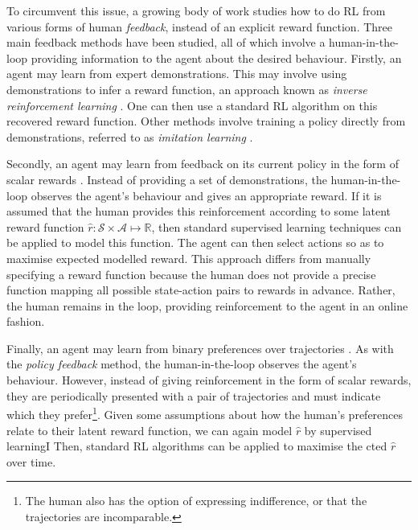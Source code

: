 \documentclass[11pt, a4paper, bibliography=totoc]{report}
\newcommand{\reals}{\mathbb{R}}
\newcommand{\rp}{\hat{r}}
\begin{document}
To circumvent this issue, a growing body of work studies how to do RL from various forms of human \textit{feedback}, instead of an explicit reward function. Three main feedback methods have been studied, all of which involve a human-in-the-loop providing information to the agent about the desired behaviour. Firstly, an agent may learn from expert demonstrations. This may involve using demonstrations to infer a reward function, an approach known as \textit{inverse reinforcement learning} \cite{Ng2000, Ziebart2008}. One can then use a standard RL algorithm on this recovered reward function. Other methods involve training a policy directly from demonstrations, referred to as \textit{imitation learning} \cite{Ho2016, Hester2017}.

Secondly, an agent may learn from feedback on its current policy in the form of scalar rewards \cite{Knox2009, Warnell2017}. Instead of providing a set of demonstrations, the human-in-the-loop observes the agent's behaviour and gives an appropriate reward. If it is assumed that the human provides this reinforcement according to some latent reward function $ \hat{r} : \mathcal{S} \times \mathcal{A} \mapsto \reals $, then standard supervised learning techniques can be applied to model this function. The agent can then select actions so as to maximise expected modelled reward. This approach differs from manually specifying a reward function because the human does not provide a precise function mapping all possible state-action pairs to rewards in advance. Rather, the human remains in the loop, providing reinforcement to the agent in an online fashion.

Finally, an agent may learn from binary preferences over trajectories \cite{Wilson2012, Christiano2017}. As with the \textit{policy feedback} method, the human-in-the-loop observes the agent's behaviour. However, instead of giving reinforcement in the form of scalar rewards, they are periodically presented with a pair of trajectories and must indicate which they prefer\footnote{The human also has the option of expressing indifference, or that the trajectories are incomparable.}. Given some assumptions about how the human's preferences relate to their latent reward function, we can again model $ \hat{r} $ by supervised learningI Then, standard RL algorithms can be applied to maximise the cted $ \rp $ over time.
\end{document}
